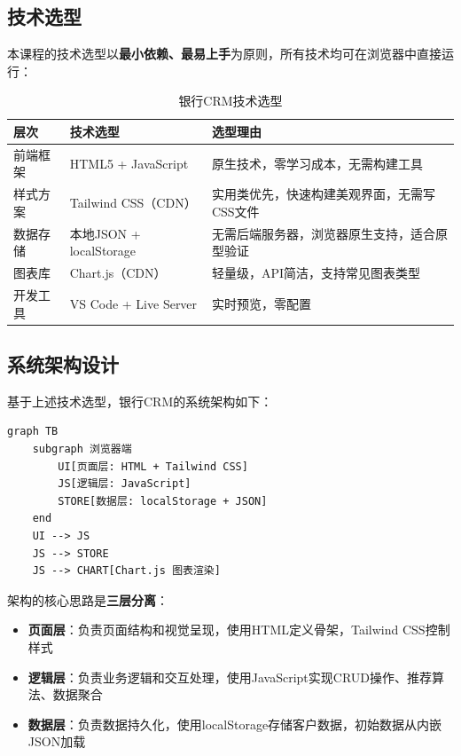 \subsection{技术选型}

本课程的技术选型以\textbf{最小依赖、最易上手}为原则，所有技术均可在浏览器中直接运行：

\begin{table}[H]
\centering
\begin{tabular}{llp{6cm}}
\toprule
\textbf{层次} & \textbf{技术选型} & \textbf{选型理由} \\
\midrule
前端框架 & HTML5 + JavaScript & 原生技术，零学习成本，无需构建工具 \\
样式方案 & Tailwind CSS（CDN） & 实用类优先，快速构建美观界面，无需写CSS文件 \\
数据存储 & 本地JSON + localStorage & 无需后端服务器，浏览器原生支持，适合原型验证 \\
图表库 & Chart.js（CDN） & 轻量级，API简洁，支持常见图表类型 \\
开发工具 & VS Code + Live Server & 实时预览，零配置 \\
\bottomrule
\end{tabular}
\caption{银行CRM技术选型}
\end{table}

\subsection{系统架构设计}

基于上述技术选型，银行CRM的系统架构如下：

\begin{lstlisting}
graph TB
    subgraph 浏览器端
        UI[页面层: HTML + Tailwind CSS]
        JS[逻辑层: JavaScript]
        STORE[数据层: localStorage + JSON]
    end
    UI --> JS
    JS --> STORE
    JS --> CHART[Chart.js 图表渲染]
\end{lstlisting}

架构的核心思路是\textbf{三层分离}：
\begin{itemize}[leftmargin=2em]
  \item \textbf{页面层}：负责页面结构和视觉呈现，使用HTML定义骨架，Tailwind CSS控制样式
  \item \textbf{逻辑层}：负责业务逻辑和交互处理，使用JavaScript实现CRUD操作、推荐算法、数据聚合
  \item \textbf{数据层}：负责数据持久化，使用localStorage存储客户数据，初始数据从内嵌JSON加载
\end{itemize}

